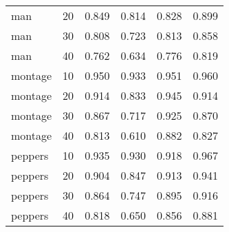 \begin{tabular}{lrrrrr}
man&20&0.849&0.814&0.828&0.899\\
man&30&0.808&0.723&0.813&0.858\\
man&40&0.762&0.634&0.776&0.819\\
montage&10&0.950&0.933&0.951&0.960\\
montage&20&0.914&0.833&0.945&0.914\\
montage&30&0.867&0.717&0.925&0.870\\
montage&40&0.813&0.610&0.882&0.827\\
peppers&10&0.935&0.930&0.918&0.967\\
peppers&20&0.904&0.847&0.913&0.941\\
peppers&30&0.864&0.747&0.895&0.916\\
peppers&40&0.818&0.650&0.856&0.881\\
\bottomrule
\end{tabular}
